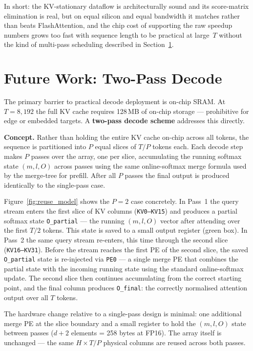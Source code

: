 \documentclass[11pt]{article}
\begin{document}
In short: the KV-stationary dataflow is architecturally sound and its
score-matrix elimination is real, but on equal silicon and equal
bandwidth it matches rather than beats FlashAttention, and the chip
cost of supporting the raw speedup numbers grows too fast with
sequence length to be practical at large~\(T\) without the kind of
multi-pass scheduling described in Section~\ref{sec:future}.

\section{Future Work: Two-Pass Decode}
\label{sec:future}

The primary barrier to practical decode deployment is on-chip SRAM.
At \(T = 8{,}192\) the full KV cache requires 128\,MB of on-chip
storage --- prohibitive for edge or embedded targets.
A \textbf{two-pass decode scheme} addresses this directly.

\textbf{Concept.}
Rather than holding the entire KV cache on-chip across all tokens,
the sequence is partitioned into \(P\) equal slices of
\(T / P\) tokens each.
Each decode step makes \(P\) passes over the array, one per slice,
accumulating the running softmax state \((m, l, O)\) across passes
using the same online-softmax merge formula used by the merge-tree
for prefill.
After all \(P\) passes the final output is produced identically
to the single-pass case.

Figure~\ref{fig:reuse_model} shows the \(P = 2\) case concretely.
In Pass~1 the query stream enters the first slice of KV columns
(\texttt{KV0--KV15}) and produces a partial softmax state
\texttt{O\_partial} --- the running \((m, l, O)\) vector after
attending over the first \(T/2\) tokens.
This state is saved to a small output register (green box).
In Pass~2 the same query stream re-enters, this time through
the second slice (\texttt{KV16--KV31}).
Before the stream reaches the first PE of the second slice,
the saved \texttt{O\_partial} state is re-injected via
\texttt{PE0} --- a single merge PE that combines the partial
state with the incoming running state using the standard
online-softmax update.
The second slice then continues accumulating from the correct
starting point, and the final column produces
\texttt{O\_final}: the correctly normalised attention output
over all \(T\) tokens.

The hardware change relative to a single-pass design is minimal:
one additional merge PE at the slice boundary and a small
register to hold the \((m, l, O)\) state between passes
(\(d + 2\) elements = 258 bytes at FP16).
The array itself is unchanged --- the same \(H \times T/P\)
physical columns are reused across both passes.
\end{document}
